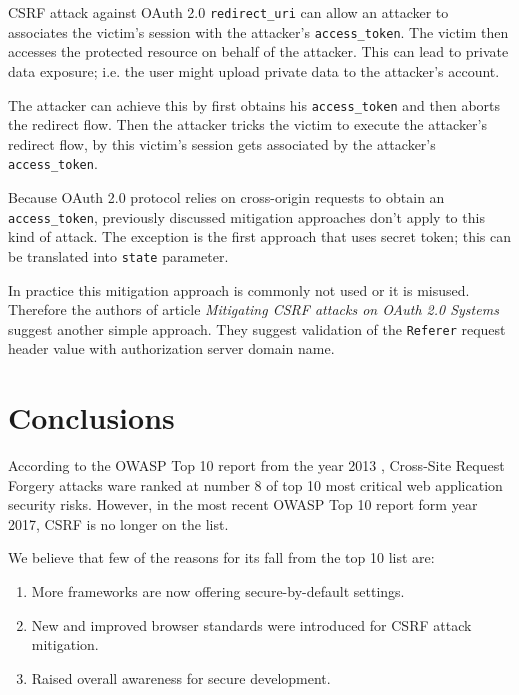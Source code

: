 \documentclass[journal,a4paper,twoside]{template/IEEEtran}
\begin{document}
CSRF attack against OAuth 2.0 \texttt{redirect\_uri} can allow an attacker to associates the victim’s session with the attacker’s \texttt{access\_token}. The victim then accesses the protected resource on behalf of the attacker. This can lead to private data exposure; i.e. the user might upload private data to the attacker’s account.

The attacker can achieve this by first obtains his \texttt{access\_token} and then aborts the redirect flow. Then the attacker tricks the victim to execute the attacker’s redirect flow, by this victim’s session gets associated by the attacker’s \texttt{access\_token}.

Because OAuth 2.0 protocol relies on cross-origin requests to obtain an \texttt{access\_token}, previously discussed mitigation approaches don't apply to this kind of attack. The exception is the first approach that uses secret token; this can be translated into \texttt{state} parameter.

In practice this mitigation approach is commonly not used or it is misused. Therefore the authors of article \textit{Mitigating CSRF attacks on OAuth 2.0 Systems} \cite{li2018mitigating} suggest another simple approach. They suggest validation of the \texttt{Referer} request header value with authorization server domain name.

\section{Conclusions}
\label{sec_conclusions}

According to the OWASP Top 10 report from the year 2013 \cite{owasptopten}, Cross-Site Request Forgery attacks ware ranked at number 8 of top 10 most critical web application security risks. However, in the most recent OWASP Top 10 report form year 2017, CSRF is no longer on the list.

We believe that few of the reasons for its fall from the top 10 list are:
\begin{enumerate}
    \item More frameworks are now offering secure-by-default settings.
    \item New and improved browser standards were introduced for CSRF attack mitigation.
    \item Raised overall awareness for secure development.
\end{enumerate}

\small



\vfill

\label{finish}
\end{document}
